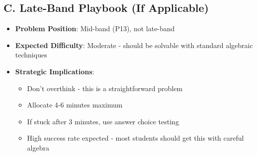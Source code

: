 \documentclass[11pt]{article}
\begin{document}
\begin{strategicbox}
\subsection*{C. Late-Band Playbook (If Applicable)}
\begin{itemize}[leftmargin=*]
    \item \textbf{Problem Position}: Mid-band (P13), not late-band
    \item \textbf{Expected Difficulty}: Moderate - should be solvable with standard algebraic techniques
    \item \textbf{Strategic Implications}: 
    \begin{itemize}[leftmargin=*]
        \item Don't overthink - this is a straightforward problem
        \item Allocate 4-6 minutes maximum
        \item If stuck after 3 minutes, use answer choice testing
        \item High success rate expected - most students should get this with careful algebra
    \end{itemize}
\end{itemize}
\end{strategicbox}
\end{document}
